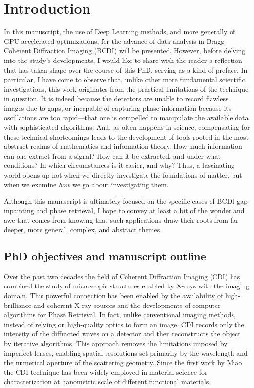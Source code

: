 \section{Introduction}\label{chp:intro}

In this manuscript, the use of Deep Learning methods, and more generally of GPU accelerated optimizations, for the advance of 
data analysis in Bragg Coherent Diffraction Imaging (BCDI) will be presented. However, before delving into the 
study’s developments, I would like to share with the reader a reflection that has taken shape over the course of this 
PhD, serving as a kind of preface. In particular, I have come to observe that, unlike other more fundamental 
scientific investigations, this work originates from the practical limitations of the technique in question. 
It is indeed because the detectors are unable to record flawless images due to gaps, or incapable of 
capturing phase information because its oscillations are too rapid—that one is compelled to manipulate the available 
data with sophisticated algorithms. And, as often happens in science, compensating for these technical shortcomings 
leads to the development of tools rooted in the most abstract realms of mathematics and information theory. How much 
information can one extract from a signal? How can it be extracted, and under what conditions? In which 
circumstances is it easier, and why? Thus, a fascinating world opens up not when we directly investigate the foundations 
of matter, but when we examine \textit{how} we go about investigating them. 

Although this manuscript is ultimately focused on the specific cases of BCDI gap inpainting and phase retrieval, 
I hope to convey at least a bit of the wonder and awe that comes from knowing that such applications draw their roots 
from far deeper, more general, complex, and abstract themes.

\subsection{PhD objectives and manuscript outline}

Over the past two decades the field of Coherent Diffraction Imaging (CDI) has combined the study of microscopic structures 
enabled by X-rays with the imaging domain. This powerful connection has been enabled by the availability of high-brilliance and 
coherent X-ray sources and the developments of computer algorithms for Phase Retrieval. In fact, unlike conventional imaging methods, 
instead of relying on high-quality optics to form an image, CDI records only the intensity of the diffracted waves on 
a detector and then reconstructs the object by iterative algorithms. 
This approach removes the limitations imposed by imperfect lenses, enabling spatial resolutions set primarily by the 
wavelength and the numerical aperture of the scattering geometry.
Since the first work by Miao \cite{Miao1998} the CDI technique has been widely employed in material science for 
characterization at nanometric scale of different functional materials. \cite{Neutze2000, Chapman2005, Schroer2008, Rodriguez2015}

